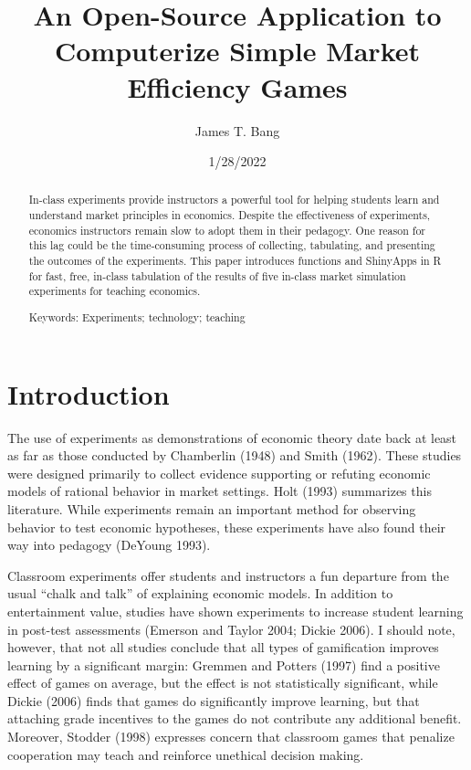\documentclass[
]{article}
\title{An Open-Source Application to Computerize Simple Market
Efficiency Games}
\author{James T. Bang}
\date{1/28/2022}
\begin{document}
\maketitle
\begin{abstract}
In-class experiments provide instructors a powerful tool for helping
students learn and understand market principles in economics. Despite
the effectiveness of experiments, economics instructors remain slow to
adopt them in their pedagogy. One reason for this lag could be the
time-consuming process of collecting, tabulating, and presenting the
outcomes of the experiments. This paper introduces functions and
ShinyApps in R for fast, free, in-class tabulation of the results of
five in-class market simulation experiments for teaching economics.

Keywords: Experiments; technology; teaching
\end{abstract}

\hypertarget{introduction}{%
\section{Introduction}\label{introduction}}

The use of experiments as demonstrations of economic theory date back at
least as far as those conducted by Chamberlin (1948) and Smith (1962).
These studies were designed primarily to collect evidence supporting or
refuting economic models of rational behavior in market settings. Holt
(1993) summarizes this literature. While experiments remain an important
method for observing behavior to test economic hypotheses, these
experiments have also found their way into pedagogy (DeYoung 1993).

Classroom experiments offer students and instructors a fun departure
from the usual ``chalk and talk'' of explaining economic models. In
addition to entertainment value, studies have shown experiments to
increase student learning in post-test assessments (Emerson and Taylor
2004; Dickie 2006). I should note, however, that not all studies
conclude that all types of gamification improves learning by a
significant margin: Gremmen and Potters (1997) find a positive effect of
games on average, but the effect is not statistically significant, while
Dickie (2006) finds that games do significantly improve learning, but
that attaching grade incentives to the games do not contribute any
additional benefit. Moreover, Stodder (1998) expresses concern that
classroom games that penalize cooperation may teach and reinforce
unethical decision making.
\end{document}
